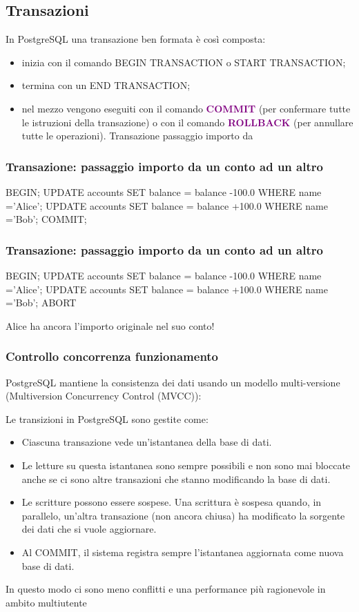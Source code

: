 \subsection{Transazioni}
In PostgreSQL una transazione ben formata è così composta:
\begin{itemize}
  \item inizia con il comando BEGIN TRANSACTION o START TRANSACTION;
  \item termina con un END TRANSACTION;
  \item nel mezzo vengono eseguiti con il comando \textcolor{purple}{\textbf{COMMIT}} (per confermare tutte le istruzioni della transazione) o con il comando \textcolor{purple}{\textbf{ROLLBACK}} (per annullare
tutte le operazioni).
Transazione passaggio importo da 
\end{itemize}


\subsubsection*{Transazione: passaggio importo da un conto ad un altro}
\begin{codiceSQL}
BEGIN;
UPDATE accounts SET balance = balance -100.0 WHERE name ='Alice';
UPDATE accounts SET balance = balance +100.0 WHERE name ='Bob';
COMMIT;
\end{codiceSQL}

\subsubsection*{Transazione: passaggio importo da un conto ad un altro}
\begin{codiceSQL}
  BEGIN;
UPDATE accounts SET balance = balance -100.0 WHERE name ='Alice';
UPDATE accounts SET balance = balance +100.0 WHERE name ='Bob';
ABORT
\end{codiceSQL}
Alice ha ancora l’importo originale nel suo conto!

\subsubsection{Controllo concorrenza funzionamento}

PostgreSQL mantiene la consistenza dei dati usando un modello multi-versione
(Multiversion Concurrency Control (MVCC)):

Le transizioni in PostgreSQL sono gestite come:
\begin{itemize}
  \item Ciascuna transazione vede un’istantanea della base di dati.
  \item Le letture su questa istantanea sono sempre possibili e non sono mai bloccate anche se ci sono altre transazioni che stanno modificando la base di dati.
 \item Le scritture possono essere sospese. Una scrittura è sospesa quando, in parallelo, un’altra transazione (non ancora chiusa) ha modificato la sorgente dei dati che si vuole aggiornare.
  \item Al COMMIT, il sistema registra sempre l’istantanea aggiornata come nuova base
di dati.
\end{itemize}
In questo modo ci sono meno conflitti e una performance più ragionevole in
ambito multiutente

